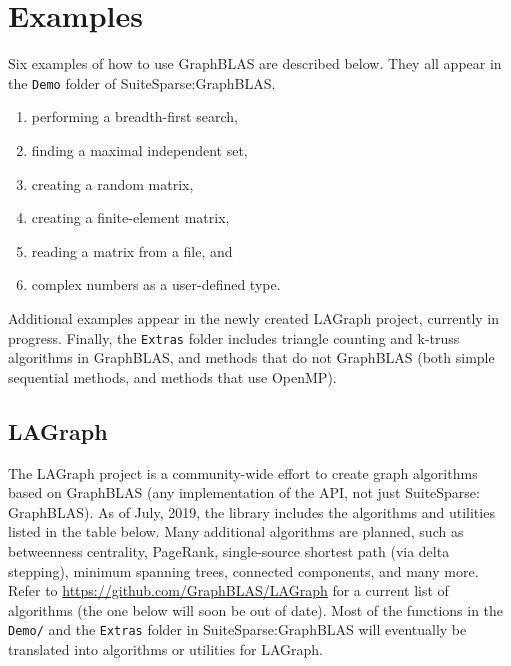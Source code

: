 \documentclass[12pt]{article}
\begin{document}
\newpage
\section{Examples} %
\label{examples}

Six examples of how to use GraphBLAS are described below.  They all
appear in the \verb'Demo' folder of SuiteSparse:GraphBLAS.

\begin{enumerate}
\item performing a breadth-first search,
\item finding a maximal independent set,
\item creating a random matrix,
\item creating a finite-element matrix,
\item reading a matrix from a file, and
\item complex numbers as a user-defined type.
\end{enumerate}

Additional examples appear in the newly created LAGraph project, currently in
progress.  Finally, the \verb'Extras' folder includes triangle counting and
k-truss algorithms in GraphBLAS, and methods that do not GraphBLAS (both simple
sequential methods, and methods that use OpenMP).

\subsection{LAGraph}
\label{lagraph}

The LAGraph project is a community-wide effort to create graph algorithms based
on GraphBLAS (any implementation of the API, not just SuiteSparse: GraphBLAS).
As of July, 2019, the library includes the algorithms and utilities listed in
the table below.  Many additional algorithms are planned, such as betweenness
centrality, PageRank, single-source shortest path (via delta stepping), minimum
spanning trees, connected components, and many more.  Refer to
\url{https://github.com/GraphBLAS/LAGraph} for a current list of algorithms
(the one below will soon be out of date).  Most of the functions in the
\verb'Demo/' and the \verb'Extras' folder in SuiteSparse:GraphBLAS will
eventually be translated into algorithms or utilities for LAGraph.
\end{document}
